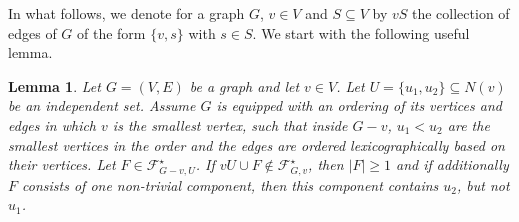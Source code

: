 \documentclass[a4paper,11pt,reqno]{amsart}
\newtheorem{lemma}[corollary]{Lemma}
\numberwithin{equation}{section}
\begin{document}
In what follows, we denote for a graph $G$, $v\in V$ and $S\subseteq V$ by $vS$ the collection of edges of $G$ of the form $\{v,s\}$ with $s\in S$.
We start with the following useful lemma.
\begin{lemma}\label{lem:structure bad}
Let $G=(V,E)$ be a graph and let $v\in V$. 
Let $U=\{u_1,u_2\}\subseteq N(v)$ be an independent set.
Assume $G$ is equipped with an ordering of its vertices and edges in which $v$ is the smallest vertex, such that inside $G-v$, $u_1<u_2$ are the smallest vertices in the order and the edges are ordered lexicographically based on their vertices.
Let $F\in \mathcal{F}^\star_{G-v,U}$.
If $vU\cup F\notin \mathcal{F}^\star_{G,v}$, then $|F|\geq 1$ and if additionally $F$ consists of one non-trivial component, then this component contains $u_2$, but not $u_1$.
\end{lemma}
\end{document}
